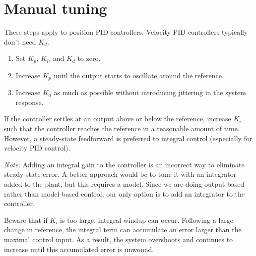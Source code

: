 \section{Manual tuning}

These steps apply to position PID controllers. Velocity PID controllers
typically don't need $K_d$.

\begin{enumerate}
  \item Set $K_p$, $K_i$, and $K_d$ to zero.
  \item Increase $K_p$ until the \gls{output} starts to oscillate around the
    \gls{reference}.
  \item Increase $K_d$ as much as possible without introducing jittering in the
    \gls{system response}.
\end{enumerate}

If the \gls{controller} settles at an \gls{output} above or below the
\gls{reference}, increase $K_i$ such that the \gls{controller} reaches the
\gls{reference} in a reasonable amount of time. However, a steady-state
feedforward is preferred to integral control (especially for velocity PID
control).

\begin{remark}
  \textit{Note:} Adding an integral gain to the \gls{controller} is an incorrect
  way to eliminate \gls{steady-state error}. A better approach would be to tune
  it with an integrator added to the \gls{plant}, but this requires a
  \gls{model}. Since we are doing output-based rather than model-based control,
  our only option is to add an integrator to the \gls{controller}.
\end{remark}

Beware that if $K_i$ is too large, integral windup can occur. Following a large
change in \gls{reference}, the integral term can accumulate an error larger than
the maximal \gls{control input}. As a result, the system overshoots and
continues to increase until this accumulated error is unwound.

